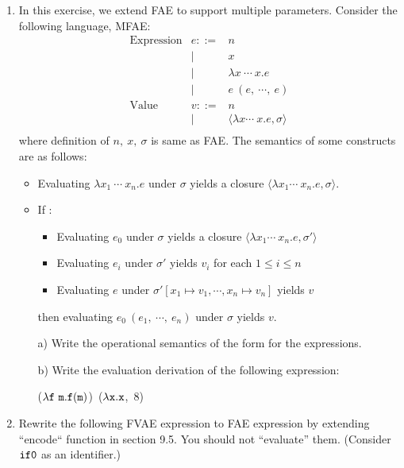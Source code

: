 \begin{enumerate}
\item In this exercise, we extend FAE to support multiple parameters. Consider the following language, MFAE:
\[
\begin{array}{lrll}
\text{Expression}& e ::= & n\\
&\mid& x\\
&\mid& \lambda x\ \cdots\ x. e\\
&\mid& e\ (e,\ \cdots ,\ e)\\
\text{Value}& v ::= & n \\
&\mid& \langle \lambda x \cdots\ x.e,\sigma \rangle \\
\end{array}
\]
where definition of $n,\ x,\ \sigma$ is same as FAE.
The semantics of some constructs are as follows:
\begin{itemize}
  \item Evaluating $\lambda x_1\ \cdots\ x_n. e$ under $\sigma$
      yields a closure $\langle \lambda x_1 \cdots\ x_n.e,\sigma \rangle$.
  \item If :
    \begin{itemize}
    \item Evaluating $e_0$ under $\sigma$ yields a closure $\langle \lambda x_1 \cdots\ x_n.e,\sigma' \rangle$
    \item Evaluating $e_i$ under $\sigma'$ yields $v_i$ for each $1 \leq i \leq n$
    \item Evaluating $e$ under $\sigma'[x_1 \mapsto v_1, \cdots, x_n \mapsto v_n]$ yields $v$
    \end{itemize}
\item[] then evaluating $e_0\ (e_1,\ \cdots ,\ e_n)$ under $\sigma$ yields $v$.
\end{itemize}

\begin{itemize}
  \item[a)] Write the operational semantics of the form  for the expressions.
  \item[b)] Write the evaluation derivation of the following expression:

\derive
{\hspace*{\textwidth}}
{\emptyset\vdash ($\lambda \code{f}\ \code{m}.\code{f}(\code{m})$)\
($\lambda \texttt{x}. \texttt{x}$,\ $8$) \Rightarrow~~~~~~~~}
\end{itemize}

\item Rewrite the following FVAE expression to FAE expression by extending ``encode`` function in section 9.5.
You should not ``evaluate'' them. (Consider $\texttt{if0}$ as an identifier.)


\end{enumerate}
